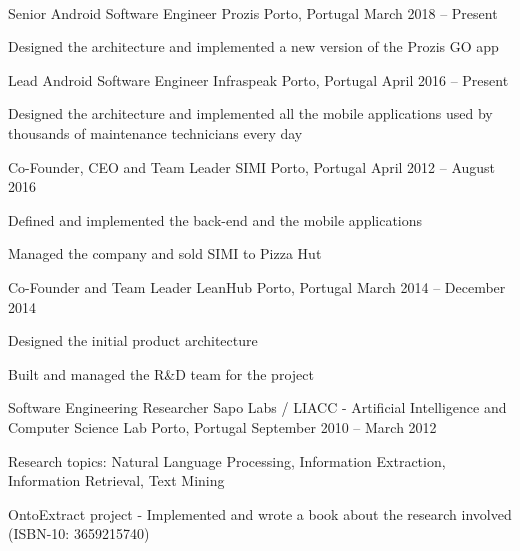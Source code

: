 \documentclass[]{awesome-cv}
\begin{document}
\begin{center}
	  \\
	
\end{center}
\vspace{-3mm}
\begin{cventries}

	\vspace{-2mm}
	\cventry
	{Senior Android Software Engineer}
	{Prozis}
	{Porto, Portugal}
	{March 2018 – Present}
	{\begin{cvitems}
		\item {Designed the architecture and implemented a new version of the Prozis GO app}
	\end{cvitems}}
	
	\vspace{-4mm}
	\cventry
	{Lead Android Software Engineer}
	{Infraspeak}
	{Porto, Portugal}
	{April 2016 – Present}
	{\begin{cvitems}
		\item {Designed the architecture and implemented all the mobile applications used by thousands of maintenance technicians every day}
		\end{cvitems}}
	
	\vspace{-4mm}
	\cventry
	{Co-Founder, CEO and Team Leader}
	{SIMI}
	{Porto, Portugal}
	{April 2012 – August 2016}
	{\begin{cvitems}
		\item {Defined and implemented the back-end and the mobile applications}
		\item {Managed the company and sold SIMI to Pizza Hut}
		\end{cvitems}}
	
	\vspace{-4mm}
	\cventry
	{Co-Founder and Team Leader}
	{LeanHub}
	{Porto, Portugal}
	{March 2014 – December 2014}
	{\begin{cvitems}
		\item {Designed the initial product architecture}
		\item {Built and managed the R\&D team for the project}
		\end{cvitems}}
	
	\vspace{-4mm}
	\cventry
	{Software Engineering Researcher}
	{Sapo Labs / LIACC - Artificial Intelligence and Computer Science Lab}
	{Porto, Portugal}
	{September 2010 – March 2012}
	{\begin{cvitems}
		\item {Research topics: Natural Language Processing, Information Extraction, Information Retrieval, Text Mining}
		\item {OntoExtract project - Implemented and wrote a book about the research involved (ISBN-10: 3659215740)}
		\end{cvitems}}
\end{cventries}
\end{document}
